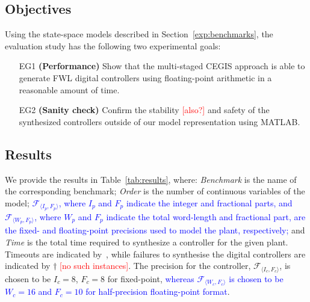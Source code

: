 \documentclass[twocolumn]{autart}    %
\newcommand{\xmark}{\ding{55}}
\renewcommand{\note}[1]{\textcolor{red}{[#1]}}
\begin{document}
 
\subsection{Objectives}
\label{exp:objectives}

Using the state-space models described in Section~\ref{exp:benchmarks}, 
the evaluation study has the following two experimental goals: 

\begin{enumerate}

\item[EG1] \textbf{(Performance)} Show that the multi-staged 
CEGIS approach is able to generate FWL digital controllers using floating-point arithmetic in a reasonable amount of time.

\item[EG2] \textbf{(Sanity check)} Confirm the stability \note{also?} and safety of the synthesized controllers outside 
of our model representation using MATLAB. 

\end{enumerate}

\subsection{Results}
\label{exp:results}

We provide the results in Table~\ref{tab:results}, where: 
\textit{Benchmark} is the name of the corresponding benchmark; 
\textit{Order} is the number of continuous variables of the model; 
\textcolor{blue}{$\mathcal{F}_{\langle I_p,F_p \rangle}$, where $I_p$ and $F_p$ indicate the integer and fractional parts,  
and \textcolor{blue}{ $\mathcal{F}_{\langle W_p,F_p \rangle}$}, where $W_p$ and $F_p$ indicate the total word-length and fractional part, 
are the fixed- and floating-point precisions used to model the plant, respectively; } 
and \textit{Time} is the total time required to synthesize a controller for the given plant.    
Timeouts are indicated by~\xmark, while failures to synthesise the digital controllers are indicated by $\dagger$ \note{no such instances}.  
The precision for the controller, $\mathcal{F}_{\langle I_c,F_c \rangle}$, is
chosen to be $I_c = 8$, $F_c = 8$ for fixed-point, \textcolor{blue}{whereas  
$\mathcal{F}_{\langle W_c, F_c \rangle}$ is chosen to be $W_c = 16$ and $F_c = 10$
for half-precision floating-point format}.
\end{document}
